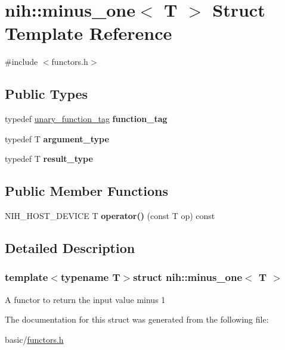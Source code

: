 \hypertarget{structnih_1_1minus__one}{
\section{nih\-:\-:minus\-\_\-one$<$ \-T $>$ \-Struct \-Template \-Reference}
\label{structnih_1_1minus__one}
}


{\ttfamily \#include $<$functors.\-h$>$}

\subsection*{\-Public \-Types}
\begin{DoxyCompactItemize}
\item 
\hypertarget{structnih_1_1minus__one_aac7a171a284a4173596317fd0f785238}{
typedef \hyperlink{structnih_1_1unary__function__tag}{unary\-\_\-function\-\_\-tag} {\bfseries function\-\_\-tag}}
\label{structnih_1_1minus__one_aac7a171a284a4173596317fd0f785238}

\item 
\hypertarget{structnih_1_1minus__one_ae6121aeabab3cfe39d07eaf1f0cfae4a}{
typedef \-T {\bfseries argument\-\_\-type}}
\label{structnih_1_1minus__one_ae6121aeabab3cfe39d07eaf1f0cfae4a}

\item 
\hypertarget{structnih_1_1minus__one_a776be8237b981f00e0a68d04421292d9}{
typedef \-T {\bfseries result\-\_\-type}}
\label{structnih_1_1minus__one_a776be8237b981f00e0a68d04421292d9}

\end{DoxyCompactItemize}
\subsection*{\-Public \-Member \-Functions}
\begin{DoxyCompactItemize}
\item 
\hypertarget{structnih_1_1minus__one_acc1f63fa4fb338bbcbc313006778e8ac}{
\-N\-I\-H\-\_\-\-H\-O\-S\-T\-\_\-\-D\-E\-V\-I\-C\-E \-T {\bfseries operator()} (const \-T op) const }
\label{structnih_1_1minus__one_acc1f63fa4fb338bbcbc313006778e8ac}

\end{DoxyCompactItemize}


\subsection{\-Detailed \-Description}
\subsubsection*{template$<$typename T$>$struct nih\-::minus\-\_\-one$<$ T $>$}

\-A functor to return the input value minus 1 

\-The documentation for this struct was generated from the following file\-:\begin{DoxyCompactItemize}
\item 
basic/\hyperlink{functors_8h}{functors.\-h}\end{DoxyCompactItemize}
